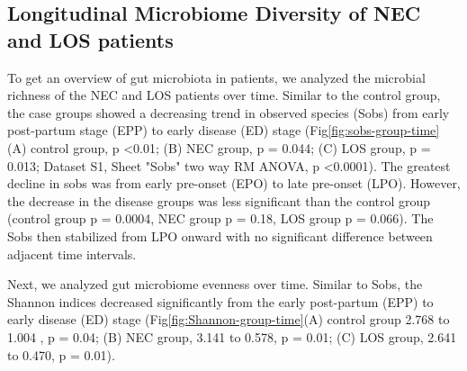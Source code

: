 \documentclass[fleqn,10pt, lineno]{wlpeerj} %
\begin{document}
   \subsection*{Longitudinal Microbiome Diversity of NEC and LOS patients}
    To get an overview of gut microbiota in patients, we analyzed the microbial richness of the NEC and LOS patients over time.  Similar to the control group, the case groups showed a decreasing trend in observed species (Sobs) from early post-partum stage (EPP) to early disease (ED) stage (Fig\ref{fig:sobs-group-time} (A) control group, p \textless 0.01; (B) NEC group, p = 0.044; (C) LOS group, p = 0.013; Dataset S1, Sheet "Sobs" two way RM ANOVA, p \textless 0.0001).  The greatest decline in sobs was from early pre-onset (EPO) to late pre-onset (LPO).  However, the decrease in the disease groups was less significant than the control group (control group p = 0.0004, NEC group p = 0.18, LOS group p = 0.066). The Sobs then stabilized from LPO onward with no significant difference between adjacent time intervals.


    Next, we analyzed gut microbiome evenness over time. Similar to Sobs, the Shannon indices decreased significantly from the early post-partum (EPP) to early disease (ED) stage (Fig\ref{fig:Shannon-group-time}(A) control group 2.768 to 1.004 , p = 0.04; (B) NEC group, 3.141 to 0.578, p = 0.01; (C) LOS group, 2.641 to 0.470, p = 0.01).

\end{document}
